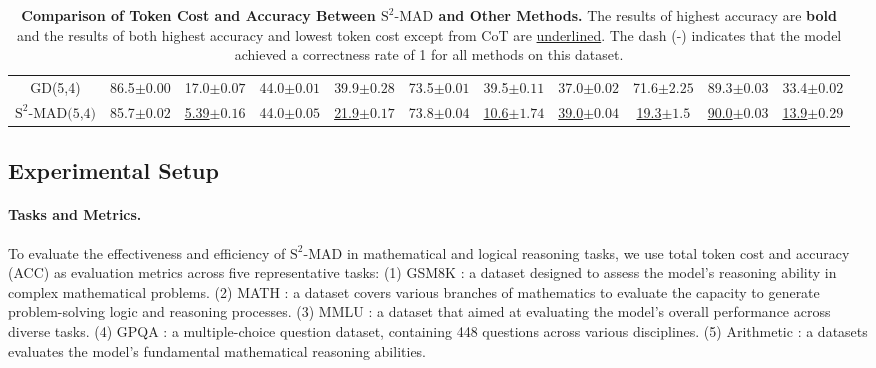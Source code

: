 \begin{table*}[t]
{\begin{tabular}{ccccccccccc}
    GD(5,4)                  & 86.5\scriptsize{$\pm 0.00$} & 17.0\scriptsize{$\pm 0.07$}           & 44.0\scriptsize{$\pm 0.01$} & 39.9\scriptsize{$\pm 0.28$}         & 73.5\scriptsize{$\pm 0.01$} & 39.5\scriptsize{$\pm 0.11$}                & 37.0\scriptsize{$\pm 0.02$} & 71.6\scriptsize{$\pm 2.25$}
    & 89.3\scriptsize{$\pm 0.03$} & 33.4\scriptsize{$\pm 0.02$}  \\
    \({\text{S}^2\text{-MAD(5,4)}}\)                  & 85.7\scriptsize{$\pm 0.02$} & \underline{5.39}\scriptsize{$\pm 0.16$}          & 44.0\scriptsize{$\pm 0.05$} & \underline{21.9}\scriptsize{$\pm 0.17$}         & 73.8\scriptsize{$\pm 0.04$} & \underline{10.6}\scriptsize{$\pm 1.74$}                & \underline{39.0}\scriptsize{$\pm 0.04$} & \underline{19.3}\scriptsize{$\pm 1.5$}         & \underline{90.0}\scriptsize{$\pm 0.03$} & \underline{13.9}\scriptsize{$\pm 0.29$}          \\
    \bottomrule
    \end{tabular}
    }
    \caption{\textbf{Comparison of Token Cost and Accuracy Between \({\text{S}^2\text{-MAD}}\) and Other Methods.} The results of highest accuracy are \textbf{bold} and the results of both highest accuracy and lowest token cost except from CoT are \underline{underlined}. The dash (-) indicates that the model achieved a correctness rate of 1 for all methods on this dataset.}
\label{tab:comparison_all}
\end{table*}


\subsection{Experimental Setup} 
\paragraph{Tasks and Metrics.} To evaluate the effectiveness and efficiency of \({\text{S}^2\text{-MAD}}\) in mathematical and logical reasoning tasks, we use total token cost and accuracy (ACC) as evaluation metrics across five representative tasks: (1) GSM8K \cite{cobbe2021training}: a dataset designed to assess the model's reasoning ability in complex mathematical problems. (2) MATH \cite{hendrycks2021measuring}: a dataset covers various branches of mathematics to evaluate the capacity to generate problem-solving logic and reasoning processes. (3) MMLU \cite{hendrycks2020measuring}: a dataset that aimed at evaluating the model's overall performance across diverse tasks. (4) GPQA \cite{rein2023gpqa}: a multiple-choice question dataset,  containing 448 questions across various disciplines. (5) Arithmetic \cite{brown2020language}: a datasets evaluates the model's fundamental mathematical reasoning abilities.

